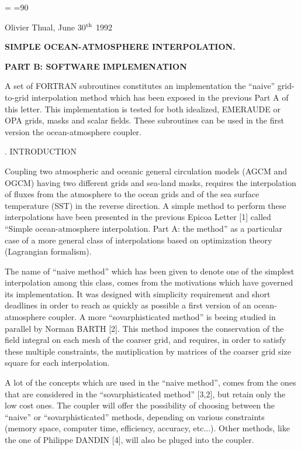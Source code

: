  \magnification =
=90



\centerline{ Olivier Thual, June 30$^{\rm th}$ 1992}
 \bigskip

\centerline{\bf SIMPLE OCEAN-ATMOSPHERE INTERPOLATION.}  
\centerline{\bf PART B: SOFTWARE IMPLEMENATION}


\bigskip


A set of FORTRAN subroutines constitutes an implementation the ``naive''
grid-to-grid interpolation method which has been exposed in the previous
Part A of this letter. This implementation  is tested  for  both idealized, 
EMERAUDE or OPA  grids, masks and scalar fields.  These
subroutines can  be used in the first version the ocean-atmosphere coupler. 





. INTRODUCTION 

Coupling two atmospheric and  oceanic general circulation models (AGCM
and OGCM) having two different grids and sea-land masks, requires the
interpolation of fluxes from the atmosphere to the ocean grids and of the
sea surface temperature (SST) in the reverse direction.  A simple method
to perform these interpolations have been presented in the previous Epicoa
Letter [1]  called ``Simple ocean-atmosphere interpolation. Part A: the method'' as a
particular case of a more general class of interpolations based on
optimization theory (Lagrangian formalism).   

\medskip

The name  of ``naive method'' which has been given to denote one of the simplest
interpolation among this class,  comes from the motivations
which have governed its implementation. It was designed with simplicity
requirement and short deadlines in order to reach as quickly as possible a
first version of an ocean-atmosphere coupler. A more ``sovarphisticated
method'' is beeing studied in parallel by Norman BARTH [2]. This method
imposes the conservation of the field integral on each mesh of the coarser
grid, and requires, in order to satisfy these multiple constraints, the
mutiplication by matrices of the coarser grid size square for each
interpolation. 

A lot of the concepts which are used in the ``naive method'', comes from
the ones that are considered in the ``sovarphisticated method'' [3,2], but retain
only the low cost ones. The coupler will offer the possibility of choosing
between the ``naive'' or ``sovarphisticated'' methods, depending on various
constraints (memory space, computer time, efficiency, accuracy, etc...).
Other methods, like the one of Philippe DANDIN [4], will also be pluged into
the coupler. 





